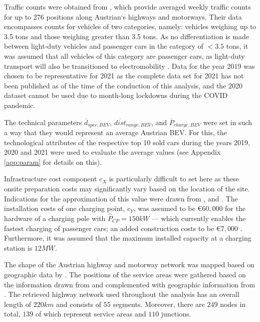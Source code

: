 \documentclass[journal,article,submit,pdftex,moreauthors]{Definitions/mdpi}
\begin{document}
    Traffic counts were obtained from \citet{asfinag}, which provide averaged weekly traffic counts for up to 276 positions along Austrian`s highways and motorways. Their data encompasses counts for vehicles of two categories, namely: vehicles weighing up to 3.5 tons and those weighing greater than 3.5 tons. As no differentiation is made between light-duty vehicles and passenger cars in the category of $< 3.5$ tons, it was assumed that all vehicles of this category are passenger cars, as light-duty transport will also be transitioned to electromobility \citep{Nachhaltig}. Data for the year 2019 was chosen to be representative for 2021 as the complete data set for 2021 has not been published as of the time of the conduction of this analysis, and the 2020 dataset cannot be used due to  month-long lockdowns during the COVID pandemic. 
    
  The technical parameters $\overline{d}_{spec, BEV}$, $\overline{dist}_{range, BEV}$, and $\overline{P}_{charge, BEV}$ were set in such a way that they would represent an average Austrian BEV. For this, the technological attributes of the respective top 10 sold cars during the years 2019, 2020 and 2021 were used to evaluate the average values (see Appendix \ref{app:param} for details on this).
    
    Infrastructure cost component $c_X$ is particularly difficult to set here as these onsite preparation costs may significantly vary based on the location of the site.
    Indications for the approximation of this value were drawn from \cite{Jochem2016}, \cite{Serradilla2017} and \cite{Verein2019}. The installation costs of one charging point, $c_Y$, was assumed to be €$60,000$ for the hardware of a charging pole with $\hat{P}_{CP} = 150kW$ --- which currently enables the fastest charging of passenger cars; an added construction costs to be €$7,000$ \citep{Verein2019, Suarez2019}. Furthermore, it was assumed that the maximum installed capacity at a charging station is $12 MW$.
    
       The shape of the Austrian highway and motorway network was mapped based on geographic data by \citet{OpenStreetMap}. The positions of the service areas were gathered based on the information drawn from \citet{asfinagrastanlagen} and complemented with geographic information from \citet{OpenStreetMap}. The retrieved highway network used throughout the analysis has an overall length of $220km$ and consists of $55$ segments. Moreover, there are $249$ nodes in total, $139$ of which represent service areas and $110$ junctions. 
\end{document}

